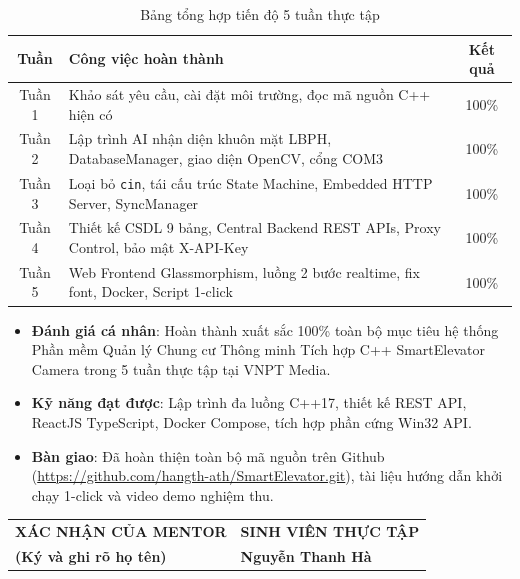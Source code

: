 \documentclass[12pt,a4paper]{article}
\begin{document}
\begin{table}[H]
\centering
\small
\begin{tabularx}{\textwidth}{|c|X|c|}
\hline
\textbf{Tuần} & \textbf{Công việc hoàn thành} & \textbf{Kết quả} \\ \hline
Tuần 1 & Khảo sát yêu cầu, cài đặt môi trường, đọc mã nguồn C++ hiện có & 100\% \\ \hline
Tuần 2 & Lập trình AI nhận diện khuôn mặt LBPH, DatabaseManager, giao diện OpenCV, cổng COM3 & 100\% \\ \hline
Tuần 3 & Loại bỏ \texttt{cin}, tái cấu trúc State Machine, Embedded HTTP Server, SyncManager & 100\% \\ \hline
Tuần 4 & Thiết kế CSDL 9 bảng, Central Backend REST APIs, Proxy Control, bảo mật X-API-Key & 100\% \\ \hline
Tuần 5 & Web Frontend Glassmorphism, luồng 2 bước realtime, fix font, Docker, Script 1-click & 100\% \\ \hline
\end{tabularx}
\caption{Bảng tổng hợp tiến độ 5 tuần thực tập}
\end{table}

\begin{itemize}
    \item \textbf{Đánh giá cá nhân}: Hoàn thành xuất sắc 100\% toàn bộ mục tiêu hệ thống Phần mềm Quản lý Chung cư Thông minh Tích hợp C++ SmartElevator Camera trong 5 tuần thực tập tại VNPT Media.
    \item \textbf{Kỹ năng đạt được}: Lập trình đa luồng C++17, thiết kế REST API, ReactJS TypeScript, Docker Compose, tích hợp phần cứng Win32 API.
    \item \textbf{Bàn giao}: Đã hoàn thiện toàn bộ mã nguồn trên Github (\url{https://github.com/hangth-ath/SmartElevator.git}), tài liệu hướng dẫn khởi chạy 1-click và video demo nghiệm thu.
\end{itemize}

\vspace{1.5cm}
\begin{table}[H]
    \centering
    \begin{tabular}{p{7cm} p{7cm}}
        \centering \textbf{XÁC NHẬN CỦA MENTOR} & \centering \textbf{SINH VIÊN THỰC TẬP} \\[3cm]
        \centering \textbf{(Ký và ghi rõ họ tên)} & \centering \textbf{Nguyễn Thanh Hà} \\
    \end{tabular}
\end{table}
\end{document}

